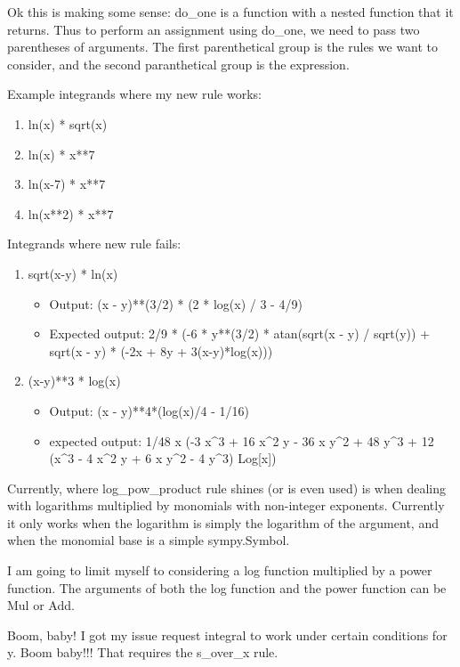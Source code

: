 Ok this is making some sense: do_one is a function with a nested function that it returns. Thus to perform an assignment using do_one, we need to pass two parentheses of arguments. The first parenthetical group is the rules we want to consider, and the second paranthetical group is the expression.

Example integrands where my new rule works:

\begin{enumerate}
\item ln(x) * sqrt(x)
\item ln(x) * x**7
\item ln(x-7) * x**7
\item ln(x**2) * x**7
\end{enumerate}

Integrands where new rule fails:

\begin{enumerate}
\item sqrt(x-y) * ln(x)
  \begin{itemize}
  \item Output: (x - y)**(3/2) * (2 * log(x) / 3 - 4/9)
  \item Expected output: 2/9 * (-6 * y**(3/2) * atan(sqrt(x - y) / sqrt(y)) + sqrt(x - y) * (-2x + 8y + 3(x-y)*log(x)))
  \end{itemize}
\item (x-y)**3 * log(x)
  \begin{itemize}
  \item Output: (x - y)**4*(log(x)/4 - 1/16)
  \item expected output: 1/48 x (-3 x^3 + 16 x^2 y - 36 x y^2 + 48 y^3 + 12 (x^3 - 4 x^2 y + 6 x y^2 - 4 y^3) Log[x])
  \end{itemize}
\end{enumerate}

Currently, where log_pow_product rule shines (or is even used) is when dealing with logarithms multiplied by monomials with non-integer exponents. Currently it only works when the logarithm is simply the logarithm of the argument, and when the monomial base is a simple sympy.Symbol.

I am going to limit myself to considering a log function multiplied by a power function. The arguments of both the log function and the power function can be Mul or Add.

Boom, baby! I got my issue request integral to work under certain conditions for y. Boom baby!!! That requires the s_over_x rule.

